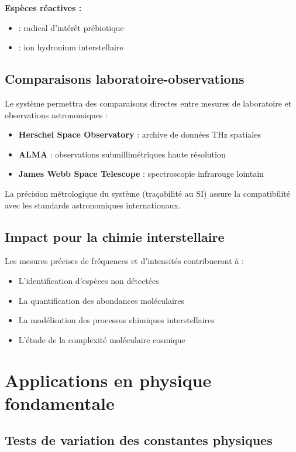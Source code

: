 \textbf{Espèces réactives :}
\begin{itemize}
    \item \NHdeux{} : radical d'intérêt prébiotique
    \item \HtroisOplus{} : ion hydronium interstellaire
\end{itemize}

\subsection{Comparaisons laboratoire-observations}

Le système permettra des comparaisons directes entre mesures de laboratoire et observations astronomiques :

\begin{itemize}
    \item \textbf{Herschel Space Observatory} : archive de données THz spatiales
    \item \textbf{ALMA} : observations submillimétriques haute résolution
    \item \textbf{James Webb Space Telescope} : spectroscopie infrarouge lointain
\end{itemize}

La précision métrologique du système (traçabilité au SI) assure la compatibilité avec les standards astronomiques internationaux.

\subsection{Impact pour la chimie interstellaire}

Les mesures précises de fréquences et d'intensités contribueront à :
\begin{itemize}
    \item L'identification d'espèces non détectées
    \item La quantification des abondances moléculaires
    \item La modélisation des processus chimiques interstellaires
    \item L'étude de la complexité moléculaire cosmique
\end{itemize}

\section{Applications en physique fondamentale}

\subsection{Tests de variation des constantes physiques}

